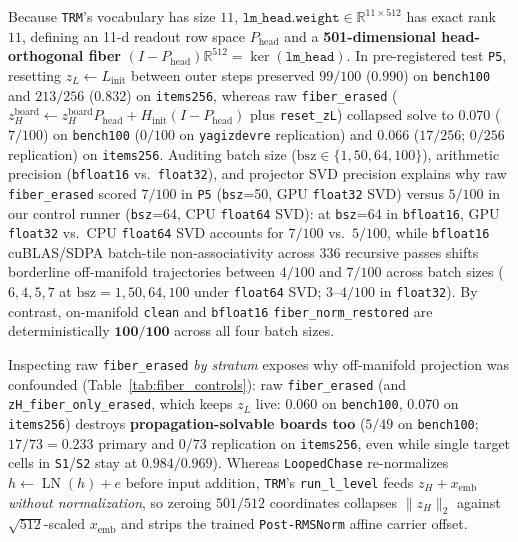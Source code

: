\documentclass[10pt,letterpaper]{article}
\newcommand{\Phead}{P_{\mathrm{head}}}
\begin{document}
Because \texttt{TRM}'s vocabulary has size $11$, $\texttt{lm\_head.weight} \in \mathbb{R}^{11 \times 512}$ has exact rank $11$, defining an 11-d readout row space $\Phead$ and a \textbf{501-dimensional head-orthogonal fiber} $(I - \Phead)\mathbb{R}^{512} = \ker(\texttt{lm\_head})$. In pre-registered test \texttt{P5}, resetting $z_L \leftarrow L_{\mathrm{init}}$ between outer steps preserved $99/100$ ($0.990$) on \texttt{bench100} and $213/256$ ($0.832$) on \texttt{items256}, whereas raw \texttt{fiber\_erased} ($z_H^{\mathrm{board}} \leftarrow z_H^{\mathrm{board}}\Phead + H_{\mathrm{init}}(I-\Phead)$ plus \texttt{reset\_zL}) collapsed solve to $0.070$ ($7/100$) on \texttt{bench100} ($0/100$ on \texttt{yagizdevre} replication) and $0.066$ ($17/256$; $0/256$ replication) on \texttt{items256}. Auditing batch size ($\mathrm{bsz}\in\{1,50,64,100\}$), arithmetic precision (\texttt{bfloat16} vs.\ \texttt{float32}), and projector SVD precision explains why raw \texttt{fiber\_erased} scored $7/100$ in \texttt{P5} (\texttt{bsz}=50, GPU \texttt{float32} SVD) versus $5/100$ in our control runner (\texttt{bsz}=64, CPU \texttt{float64} SVD): at \texttt{bsz}=64 in \texttt{bfloat16}, GPU \texttt{float32} vs.\ CPU \texttt{float64} SVD accounts for $7/100$ vs.\ $5/100$, while \texttt{bfloat16} cuBLAS/SDPA batch-tile non-associativity across 336 recursive passes shifts borderline off-manifold trajectories between $4/100$ and $7/100$ across batch sizes ($6, 4, 5, 7$ at $\mathrm{bsz}=1, 50, 64, 100$ under \texttt{float64} SVD; $3$--$4/100$ in \texttt{float32}). By contrast, on-manifold \texttt{clean} and \texttt{bfloat16} \texttt{fiber\_norm\_restored} are deterministically $\mathbf{100/100}$ across all four batch sizes.

Inspecting raw \texttt{fiber\_erased} \emph{by stratum} exposes why off-manifold projection was confounded (Table~\ref{tab:fiber_controls}): raw \texttt{fiber\_erased} (and \texttt{zH\_fiber\_only\_erased}, which keeps $z_L$ live: $0.060$ on \texttt{bench100}, $0.070$ on \texttt{items256}) destroys \textbf{propagation-solvable boards too} ($5/49$ on \texttt{bench100}; $17/73 = 0.233$ primary and $0/73$ replication on \texttt{items256}, even while single target cells in \texttt{S1}/\texttt{S2} stay at $0.984/0.969$). Whereas \texttt{LoopedChase} re-normalizes $h \leftarrow \operatorname{LN}(h) + e$ before input addition, \texttt{TRM}'s \texttt{run\_l\_level} feeds $z_H + x_{\mathrm{emb}}$ \emph{without normalization}, so zeroing $501/512$ coordinates collapses $\|z_H\|_2$ against $\sqrt{512}$-scaled $x_{\mathrm{emb}}$ and strips the trained \texttt{Post-RMSNorm} affine carrier offset.
\end{document}
